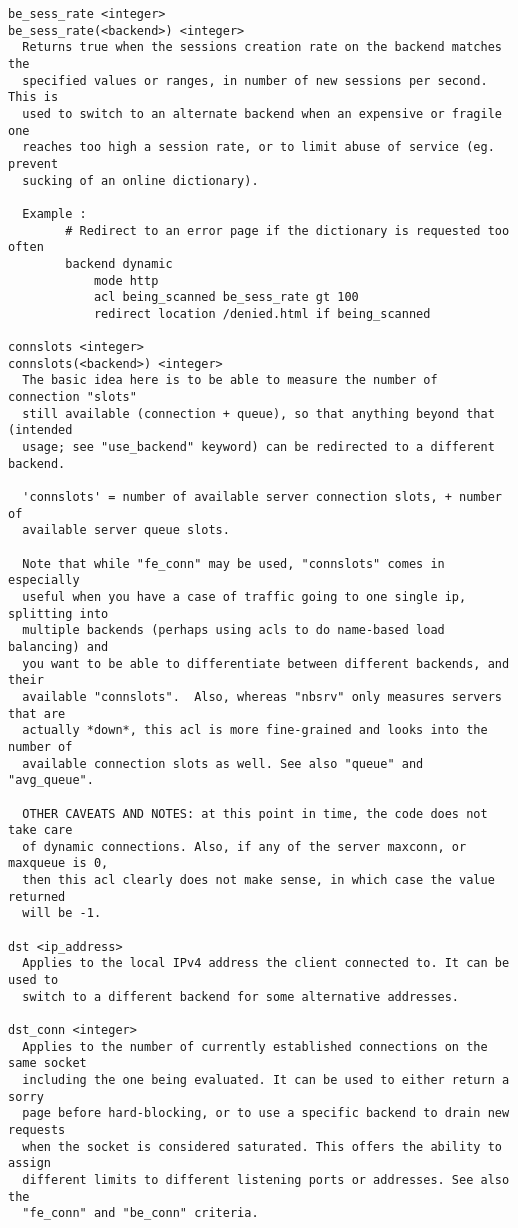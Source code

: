 \begin{verbatim}
be_sess_rate <integer>
be_sess_rate(<backend>) <integer>
  Returns true when the sessions creation rate on the backend matches the
  specified values or ranges, in number of new sessions per second. This is
  used to switch to an alternate backend when an expensive or fragile one
  reaches too high a session rate, or to limit abuse of service (eg. prevent
  sucking of an online dictionary).

  Example :
        # Redirect to an error page if the dictionary is requested too often
        backend dynamic
            mode http
            acl being_scanned be_sess_rate gt 100
            redirect location /denied.html if being_scanned

connslots <integer>
connslots(<backend>) <integer>
  The basic idea here is to be able to measure the number of connection "slots"
  still available (connection + queue), so that anything beyond that (intended
  usage; see "use_backend" keyword) can be redirected to a different backend.

  'connslots' = number of available server connection slots, + number of
  available server queue slots.

  Note that while "fe_conn" may be used, "connslots" comes in especially
  useful when you have a case of traffic going to one single ip, splitting into
  multiple backends (perhaps using acls to do name-based load balancing) and
  you want to be able to differentiate between different backends, and their
  available "connslots".  Also, whereas "nbsrv" only measures servers that are
  actually *down*, this acl is more fine-grained and looks into the number of
  available connection slots as well. See also "queue" and "avg_queue".

  OTHER CAVEATS AND NOTES: at this point in time, the code does not take care
  of dynamic connections. Also, if any of the server maxconn, or maxqueue is 0,
  then this acl clearly does not make sense, in which case the value returned
  will be -1.

dst <ip_address>
  Applies to the local IPv4 address the client connected to. It can be used to
  switch to a different backend for some alternative addresses.

dst_conn <integer>
  Applies to the number of currently established connections on the same socket
  including the one being evaluated. It can be used to either return a sorry
  page before hard-blocking, or to use a specific backend to drain new requests
  when the socket is considered saturated. This offers the ability to assign
  different limits to different listening ports or addresses. See also the
  "fe_conn" and "be_conn" criteria.


\end{verbatim}
